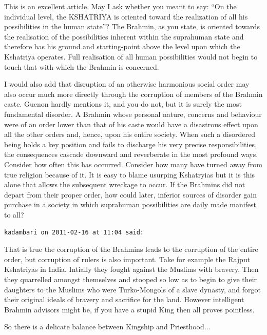 \begin{footnotesize}
\begin{sffamily}
This is an excellent article. May I ask whether you meant to say: ``On the individual level, the KSHATRIYA is oriented toward the realization of all his possibilities in the human state''? The Brahmin, as you state, is oriented towards the realisation of the possibilities inherent within the suprahuman state and therefore has his ground and starting-point above the level upon which the Kshatriya operates. Full realisation of all human possibilities would not begin to touch that with which the Brahmin is concerned.

I would also add that disruption of an otherwise harmonious social order may also occur much more directly through the corruption of members of the Brahmin caste. Guenon hardly mentions it, and you do not, but it is surely the most fundamental disorder. A Brahmin whose personal nature, concerns and behaviour were of an order lower than that of his caste would have a disastrous effect upon all the other orders and, hence, upon his entire society. When such a disordered being holds a key position and fails to discharge his very precise responsibilities, the consequences cascade downward and reverberate in the most profound ways. Consider how often this has occurred. Consider how many have turned away from true religion because of it. It is easy to blame usurping Kshatryias but it is this alone that allows the subsequent wreckage to occur. If the Brahmins did not depart from their proper order, how could later, inferior sources of disorder gain purchase in a society in which suprahuman possibilities are daily made manifest to all?

\hfill

\texttt{kadambari on 2011-02-16 at 11:04 said:}

That is true the corruption of the Brahmins leads to the corruption of the entire order, but corruption of rulers is also important. Take for example the Rajput Kshatriyas in India. Intially they fought against the Muslims with bravery. Then they quarrelled amongst themselves and stooped so low as to begin to give their daughters to the Muslims who were Turko-Mongols of a slave dynasty, and forgot their original ideals of bravery and sacrifice for the land. However intelligent Brahmin advisors might be, if you have a stupid King then all proves pointless.

So there is a delicate balance between Kingship and Priesthood... 

\hfill

\end{sffamily}
\end{footnotesize}

